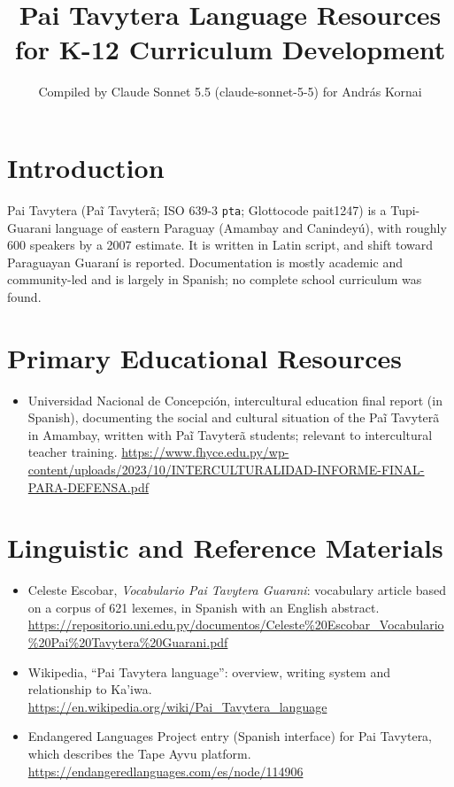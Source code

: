 \documentclass[12pt]{article}
\title{Pai Tavytera Language Resources for K-12 Curriculum Development}
\author{Compiled by Claude Sonnet 5.5 (claude-sonnet-5-5) for Andr\'as Kornai}
\date{}
\begin{document}
\maketitle

\section{Introduction}
Pai Tavytera (Pa\~i Tavyter\~a; ISO 639-3 \texttt{pta}; Glottocode pait1247) is a Tupi-Guarani language of eastern Paraguay (Amambay and Canindey\'u), with roughly 600 speakers by a 2007 estimate. It is written in Latin script, and shift toward Paraguayan Guaran\'i is reported. Documentation is mostly academic and community-led and is largely in Spanish; no complete school curriculum was found.

\section{Primary Educational Resources}
\begin{itemize}
\item Universidad Nacional de Concepci\'on, intercultural education final report (in Spanish), documenting the social and cultural situation of the Pa\~i Tavyter\~a in Amambay, written with Pa\~i Tavyter\~a students; relevant to intercultural teacher training. \url{https://www.fhyce.edu.py/wp-content/uploads/2023/10/INTERCULTURALIDAD-INFORME-FINAL-PARA-DEFENSA.pdf}
\end{itemize}

\section{Linguistic and Reference Materials}
\begin{itemize}
\item Celeste Escobar, \emph{Vocabulario Pai Tavytera Guarani}: vocabulary article based on a corpus of 621 lexemes, in Spanish with an English abstract. \url{https://repositorio.uni.edu.py/documentos/Celeste%20Escobar_Vocabulario%20Pai%20Tavytera%20Guarani.pdf}
\item Wikipedia, ``Pai Tavytera language'': overview, writing system and relationship to Ka'iwa. \url{https://en.wikipedia.org/wiki/Pai_Tavytera_language}
\item Endangered Languages Project entry (Spanish interface) for Pai Tavytera, which describes the Tape Ayvu platform. \url{https://endangeredlanguages.com/es/node/114906}
\end{itemize}
\end{document}
